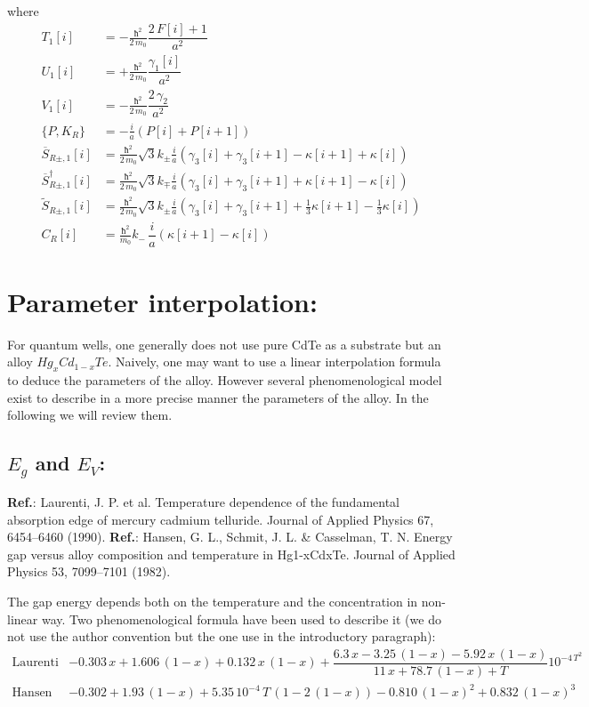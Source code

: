 \documentclass[prb,aps]{revtex4}
\begin{document}
    where
	\begin{align}
	    T_1[i] &= - \frac{ħ^2}{2\,m_0} \dfrac{2\,F[i] + 1}{a^2} \\
		U_1[i] &= + \frac{ħ^2 }{2\,m_0} \dfrac{γ_1[i]}{a^2}\\
		V_1[i] &= - \frac{ħ^2 }{2\,m_0} \dfrac{2\,γ_2}{a^2}\\
		\{P,K_R\} &= - \frac{i}{a}\left(P[i]+P[i+1]\right)\\
		\overline{S}_{R\pm,1}[i]
		&= \frac{ħ^2}{2\,m_0} \sqrt{3}  k_\pm \frac{i}{a} \left(γ_3[i] + γ_3[i+1]-κ[i+1]+κ[i]\right)\\
		\overline{S}_{R\pm,1}^\dagger[i]
		&= \frac{ħ^2}{2\,m_0} \sqrt{3}  k_\mp \frac{i}{a} \left(γ_3[i] + γ_3[i+1]+κ[i+1]-κ[i]\right)\\
		\tilde{S}_{R\pm,1}[i]
		&= \frac{ħ^2}{2\,m_0} \sqrt{3}  k_\pm \frac{i}{a} \left(γ_3[i] + γ_3[i+1] + \frac13 κ[i+1] - \frac13 κ[i]\right)\\
		C_R[i] &= \frac{ħ^2}{m_0} k_-\,\dfrac{i}{a}\left(κ[i+1]-κ[i]\right)		
	\end{align}




\section{Parameter interpolation:}

    For quantum wells, one generally does not use pure CdTe as a substrate but an alloy $Hg_xCd_{1-x}Te$. Naively, one may want to use a linear interpolation formula to deduce the parameters of the alloy. However several phenomenological model exist to describe in a more precise manner the parameters of the alloy. In the following we will review them.

    \subsection{$E_g$ and $E_V$:}

        {\bf Ref.}:  Laurenti, J. P. et al. Temperature dependence of the fundamental absorption edge of mercury cadmium telluride. Journal of Applied Physics 67, 6454–6460 (1990).
        {\bf Ref.}:  Hansen, G. L., Schmit, J. L. \& Casselman, T. N. Energy gap versus alloy composition and temperature in Hg1-xCdxTe. Journal of Applied Physics 53, 7099–7101 (1982).


        The gap energy depends both on the temperature and the concentration in non-linear way. Two phenomenological formula have been used to describe it (we do not use the author convention but the one use in the introductory paragraph):
        \begin{align}
            \text{Laurenti}& -0.303\,x + 1.606\,(1-x) + 0.132\,x\,(1-x) + \dfrac{6.3\,x - 3.25\,(1-x) - 5.92\,x\,(1-x)}{11\,x + 78.7\,(1-x) + T}10^{-4\,T^2}\\
            \text{Hansen}& -0.302 + 1.93\,(1-x) + 5.35\,10^{-4}\,T\,(1-2\,(1-x)) -0.810\,(1-x)^2 + 0.832\,(1-x)^3
        \end{align}
\end{document}
